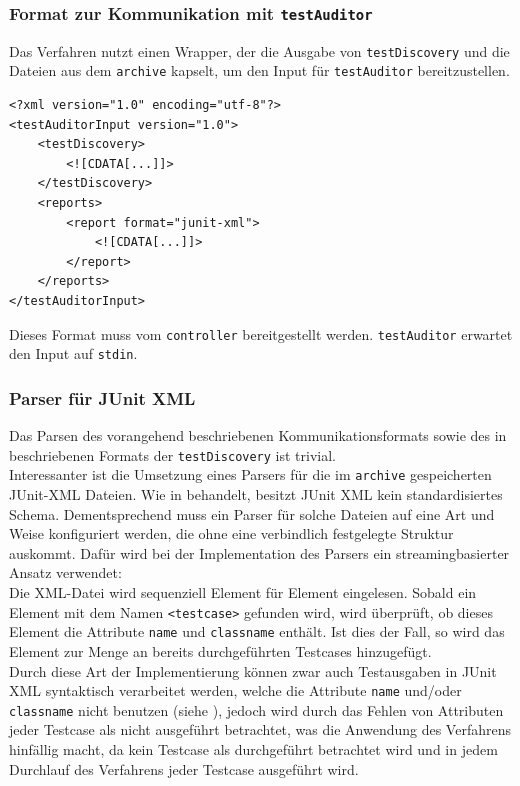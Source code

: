 \subsubsection{Format zur Kommunikation mit \texttt{testAuditor}}\label{chap:format_testAuditor}
Das Verfahren nutzt einen Wrapper, der die Ausgabe von \texttt{testDiscovery} und die Dateien aus dem \texttt{archive} kapselt, um den Input für \texttt{testAuditor} bereitzustellen. 
\begin{lstlisting}[caption={Kommunikationsformat für \texttt{testAuditor}}, label={testAuditor_Format}]
<?xml version="1.0" encoding="utf-8"?>
<testAuditorInput version="1.0">
    <testDiscovery>
        <![CDATA[...]]>
    </testDiscovery>
    <reports>
        <report format="junit-xml">
            <![CDATA[...]]>
        </report>
    </reports>
</testAuditorInput>
\end{lstlisting}
Dieses Format muss vom \texttt{controller} bereitgestellt werden. \texttt{testAuditor} erwartet den Input auf \texttt{stdin}. 

\subsubsection{Parser für JUnit XML}
Das Parsen des vorangehend beschriebenen Kommunikationsformats sowie des in  beschriebenen Formats der \texttt{testDiscovery} ist trivial.\\
Interessanter ist die Umsetzung eines Parsers für die im \texttt{archive} gespeicherten JUnit-XML Dateien. Wie in  behandelt, besitzt JUnit XML kein standardisiertes Schema. Dementsprechend muss ein Parser für solche Dateien auf eine Art und Weise konfiguriert werden, die ohne eine verbindlich festgelegte Struktur auskommt. Dafür wird bei der Implementation des Parsers ein streamingbasierter Ansatz verwendet:\\
Die XML-Datei wird sequenziell Element für Element eingelesen. Sobald ein Element mit dem Namen \texttt{<testcase>} gefunden wird, wird überprüft, ob dieses Element die Attribute \texttt{name} und \texttt{classname} enthält. Ist dies der Fall, so wird das Element zur Menge an bereits durchgeführten Testcases hinzugefügt.\\
Durch diese Art der Implementierung können zwar auch Testausgaben in JUnit XML syntaktisch verarbeitet werden, welche die Attribute \texttt{name} und/oder \texttt{classname} nicht benutzen (siehe ), jedoch wird durch das Fehlen von Attributen jeder Testcase als nicht ausgeführt betrachtet, was die Anwendung des Verfahrens hinfällig macht, da kein Testcase als durchgeführt betrachtet wird und in jedem Durchlauf des Verfahrens jeder Testcase ausgeführt wird. 

